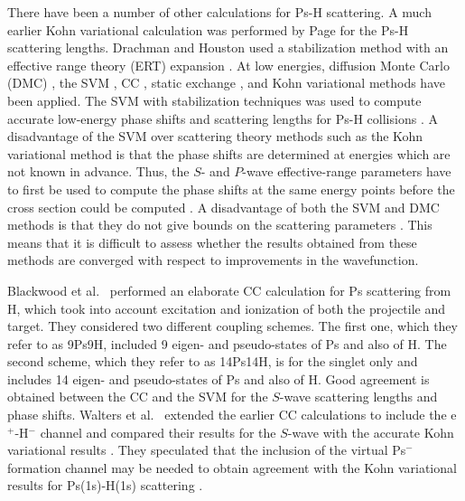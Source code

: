 \documentclass[preprint,showpacs,showkeys,preprintnumbers,amsmath,amssymb,longbibliography,pra,aps]{revtex4-1}
\begin{document}

There have been a number of other calculations for Ps-H scattering. A much 
earlier Kohn variational calculation was performed by Page \cite{Page1976} 
for the Ps-H scattering lengths. Drachman and Houston used a stabilization 
method with an effective range theory (ERT) expansion
\cite{Drachman1975,Drachman1976}. At low energies, diffusion Monte Carlo (DMC)
\cite{Chiesa2002}, the SVM \cite{Ivanov2001,Ivanov2002}, CC
\cite{Sinha1997,Campbell1998,Adhikari1999,Sinha2000,Blackwood2002,Blackwood2002b,Walters2004},
static exchange \cite{Hara1975,Ray1997}, and Kohn variational
\cite{Page1976,VanReeth2003,VanReeth2004} methods have been applied. The SVM
with stabilization 
techniques was used to compute accurate low-energy phase shifts and 
scattering lengths for Ps-H collisions \cite{Ivanov2001,Ivanov2002}. A 
disadvantage of the SVM over scattering theory methods such as the Kohn 
variational method is that the phase shifts are determined at energies which 
are not known in advance. Thus, the $S$- and $P$-wave effective-range parameters 
have to first be used to compute the phase shifts at the same energy points 
before the cross section could be computed \cite{Ivanov2002}. A disadvantage 
of both the SVM and DMC methods is that they do not give bounds on the 
scattering parameters \cite{VanReeth2003}. This means that it is difficult to 
assess whether the results obtained from these methods are converged with 
respect to improvements in the wavefunction.

Blackwood et al.~\cite{Blackwood2002} performed an elaborate CC calculation 
for Ps scattering from H, which took into account excitation and ionization 
of both the projectile and target. They considered two different coupling 
schemes. The first one, which they refer to as 9Ps9H, included 9 eigen- and 
pseudo-states of Ps and also of H. The second scheme, which they refer to as 
14Ps14H, is for the singlet only and includes 14 eigen- and pseudo-states of 
Ps and also of H. Good agreement is obtained between the CC
\cite{Blackwood2002} and the SVM \cite{Ivanov2002} for the $S$-wave scattering
lengths and phase shifts. Walters et al.~\cite{Walters2004}
extended the earlier CC calculations \cite{Blackwood2002} to include the
e$^+$-H$^-$ channel
\cite{Blackwood2002b} and compared their results for the $S$-wave with the
accurate Kohn variational results \cite{VanReeth2003}. They speculated that the
inclusion of the virtual Ps$^-$ formation channel may be needed to obtain 
agreement with the Kohn variational results for Ps(1s)-H(1s) scattering 
\cite{Blackwood2002}.
\end{document}
